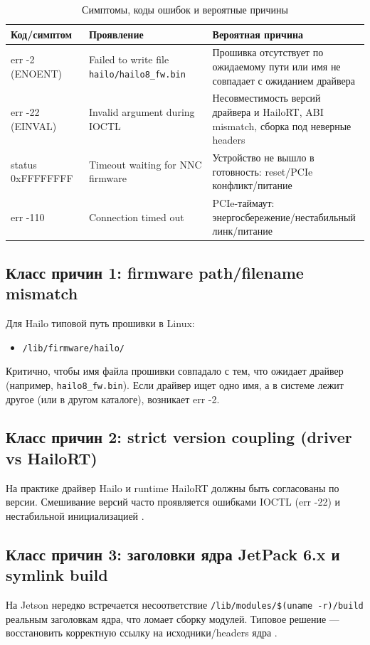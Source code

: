 \documentclass[11pt,a4paper]{article}
\begin{document}
\begin{table}[h]
\centering
\caption{Симптомы, коды ошибок и вероятные причины}
\label{tab:errors}
\begin{tabular}{p{2.5cm} p{6.0cm} p{6.5cm}}
\toprule
\textbf{Код/симптом} & \textbf{Проявление} & \textbf{Вероятная причина} \\
\midrule
err -2 (ENOENT) & Failed to write file \texttt{hailo/hailo8\_fw.bin} & Прошивка отсутствует по ожидаемому пути или имя не совпадает с ожиданием драйвера \\
err -22 (EINVAL) & Invalid argument during IOCTL & Несовместимость версий драйвера и HailoRT, ABI mismatch, сборка под неверные headers \\
status 0xFFFFFFFF & Timeout waiting for NNC firmware & Устройство не вышло в готовность: reset/PCIe конфликт/питание \\
err -110 & Connection timed out & PCIe-таймаут: энергосбережение/нестабильный линк/питание \\
\bottomrule
\end{tabular}
\end{table}

\subsection{Класс причин 1: firmware path/filename mismatch}
Для Hailo типовой путь прошивки в Linux:
\begin{itemize}[leftmargin=1.2em]
  \item \texttt{/lib/firmware/hailo/}
\end{itemize}
Критично, чтобы имя файла прошивки совпадало с тем, что ожидает драйвер (например, \texttt{hailo8\_fw.bin}).
Если драйвер ищет одно имя, а в системе лежит другое (или в другом каталоге), возникает err -2.

\subsection{Класс причин 2: strict version coupling (driver vs HailoRT)}
На практике драйвер Hailo и runtime HailoRT должны быть согласованы по версии. Смешивание версий часто проявляется ошибками IOCTL (err -22) и нестабильной инициализацией \citep{hailo_community_guides}.

\subsection{Класс причин 3: заголовки ядра JetPack 6.x и symlink build}
На Jetson нередко встречается несоответствие \texttt{/lib/modules/\$(uname -r)/build} реальным заголовкам ядра, что ломает сборку модулей. Типовое решение — восстановить корректную ссылку на исходники/headers ядра \citep{nvidia_forum_build_mismatch}.
\end{document}
